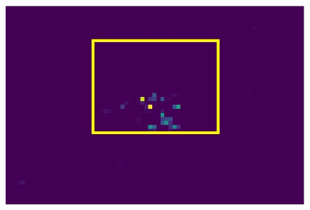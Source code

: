 \begin{figure}[h!]
{\begin{minipage}[t]{3.5cm}
		\end{minipage}
		\begin{minipage}[t]{3.5cm}
			\centering
			\includegraphics[width=0.9\linewidth]{figures/pixel/map2_3}
	\end{minipage}}
	

\end{figure}
